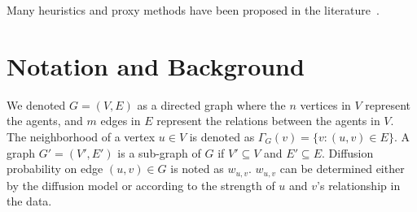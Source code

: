\documentclass[10pt,journal,compsoc]{IEEEtran}
\begin{document}
Many heuristics and proxy methods have been proposed in the literature~\cite{MixGreedy, narayanam2010shapley, kimura2007extracting, chen2010PMIA,chen2010LDAG, kim2013scalable, skim, goyal2011simpath, jung2012irie,cheng2014imrank,liu2014influence,galhotra2016holistic}.


\section{Notation and Background}\label{sec:background}

We denoted $G = (V,E)$ as a directed graph where the $n$ vertices in $V$ represent the agents, and $m$ edges in $E$ represent the relations between the agents in $V$.
The neighborhood of a vertex $u \in V$ is denoted as $\Gamma_G(v) = \{v: (u,v) \in E\}$. 
A graph $G' = (V',E')$ is a sub-graph of $G$ if $V' \subseteq V$ and $E' \subseteq E$. 
Diffusion probability on edge $(u, v) \in G$ is noted as $w_{u,v}$.
$w_{u,v}$ can be determined either by the diffusion model or according to the strength of $u$ and $v$'s relationship in the data.
\end{document}
